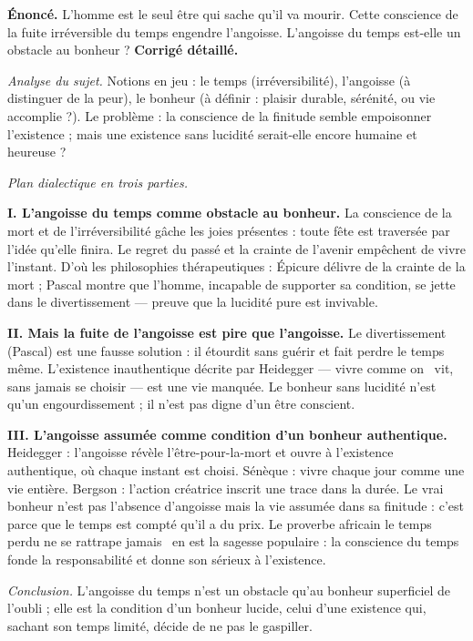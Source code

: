 \documentclass[11pt]{article}
\begin{document}
\begin{exoresolu}
\textbf{Énoncé.} L'homme est le seul être qui sache qu'il va mourir. Cette conscience de la fuite irréversible du temps engendre l'angoisse. L'angoisse du temps est-elle un obstacle au bonheur ?
\tcblower
\textbf{Corrigé détaillé.}

\emph{Analyse du sujet.} Notions en jeu : le temps (irréversibilité), l'angoisse (à distinguer de la peur), le bonheur (à définir : plaisir durable, sérénité, ou vie accomplie ?). Le problème : la conscience de la finitude semble empoisonner l'existence ; mais une existence sans lucidité serait-elle encore humaine et heureuse ?

\emph{Plan dialectique en trois parties.}

\textbf{I. L'angoisse du temps comme obstacle au bonheur.} La conscience de la mort et de l'irréversibilité gâche les joies présentes : toute fête est traversée par l'idée qu'elle finira. Le regret du passé et la crainte de l'avenir empêchent de vivre l'instant. D'où les philosophies thérapeutiques : Épicure délivre de la crainte de la mort ; Pascal montre que l'homme, incapable de supporter sa condition, se jette dans le divertissement — preuve que la lucidité pure est invivable.

\textbf{II. Mais la fuite de l'angoisse est pire que l'angoisse.} Le divertissement (Pascal) est une fausse solution : il étourdit sans guérir et fait perdre le temps même. L'existence inauthentique décrite par Heidegger — vivre comme \guillemotleft on \guillemotright\ vit, sans jamais se choisir — est une vie manquée. Le bonheur sans lucidité n'est qu'un engourdissement ; il n'est pas digne d'un être conscient.

\textbf{III. L'angoisse assumée comme condition d'un bonheur authentique.} Heidegger : l'angoisse révèle l'être-pour-la-mort et ouvre à l'existence authentique, où chaque instant est choisi. Sénèque : vivre chaque jour comme une vie entière. Bergson : l'action créatrice inscrit une trace dans la durée. Le vrai bonheur n'est pas l'absence d'angoisse mais la vie assumée dans sa finitude : c'est parce que le temps est compté qu'il a du prix. Le proverbe africain \guillemotleft le temps perdu ne se rattrape jamais \guillemotright\ en est la sagesse populaire : la conscience du temps fonde la responsabilité et donne son sérieux à l'existence.

\emph{Conclusion.} L'angoisse du temps n'est un obstacle qu'au bonheur superficiel de l'oubli ; elle est la condition d'un bonheur lucide, celui d'une existence qui, sachant son temps limité, décide de ne pas le gaspiller.
\end{exoresolu}
\end{document}
